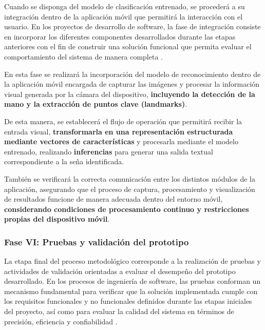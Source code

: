	Cuando se disponga del modelo de clasificación entrenado, se procederá a su
	integración dentro de la aplicación móvil que permitirá la interacción con el
	usuario. En los proyectos de desarrollo de software, la fase de integración
	consiste en incorporar los diferentes componentes desarrollados durante las
	etapas anteriores con el fin de construir una solución funcional que permita
	evaluar el comportamiento del sistema de manera completa
	\cite{pressman2014,sommerville2016}.
	
	En esta fase se realizará la incorporación del modelo de reconocimiento
	dentro de la aplicación móvil encargada de capturar las imágenes y procesar la
	información visual generada por la cámara del dispositivo, \textbf{incluyendo la detección de la mano y la extracción de puntos clave (landmarks)}.
	
	De esta manera, se establecerá el flujo de operación que permitirá recibir la entrada visual,
	\textbf{transformarla en una representación estructurada mediante vectores de características} y procesarla mediante el modelo entrenado, realizando \textbf{inferencias} para generar una salida textual
	correspondiente a la seña identificada.
	
	También se verificará la correcta comunicación entre los distintos módulos
	de la aplicación, asegurando que el proceso de captura, procesamiento y
	visualización de resultados funcione de manera adecuada dentro del entorno
	móvil, \textbf{considerando condiciones de procesamiento continuo y restricciones propias del dispositivo móvil}.
	
	\subsubsection{Fase VI: Pruebas y validación del prototipo}
	
	La etapa final del proceso metodológico corresponde a la realización de
	pruebas y actividades de validación orientadas a evaluar el desempeño del
	prototipo desarrollado. En los procesos de ingeniería de software, las pruebas
	conforman un mecanismo fundamental para verificar que la solución implementada
	cumple con los requisitos funcionales y no funcionales definidos durante las
	etapas iniciales del proyecto, así como para evaluar la calidad del sistema en
	términos de precisión, eficiencia y confiabilidad \cite{pressman2014,mall2018}.
	
